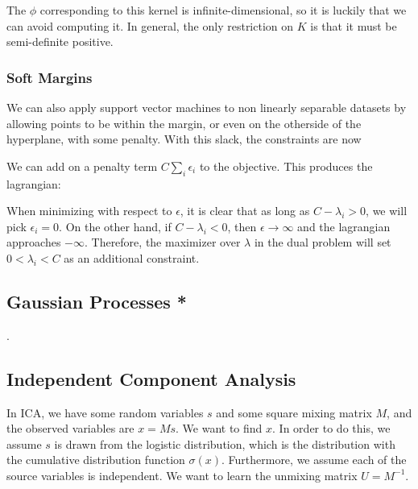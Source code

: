 \documentclass[12pt]{article}
\begin{document}

The $\phi$ corresponding to this kernel is infinite-dimensional, so it is luckily that we can avoid computing it. In general, the only restriction on $K$ is that it must be semi-definite positive.

\subsubsection{Soft Margins}

We can also apply support vector machines to non linearly separable datasets by allowing points to be within the margin, or even on the otherside of the hyperplane, with some penalty. With this slack, the constraints are now


We can add on a penalty term $C\sum_i \epsilon_i$ to the objective. This produces the lagrangian:


When minimizing with respect to $\epsilon$, it is clear that as long as $C-\lambda_i > 0$, we will pick $\epsilon_i = 0$. On the other hand, if $C -\lambda_i < 0$, then $\epsilon \rightarrow \infty$ and the lagrangian approaches $- \infty$. Therefore, the maximizer over $\lambda$ in the dual problem will set $0 < \lambda_i < C$ as an additional constraint.

\subsection{Gaussian Processes *}
.
\subsection{Independent Component Analysis}

In ICA, we have some random variables $s$ and some square mixing matrix $M$, and the observed variables are $x = Ms$. We want to find $x$. In order to do this, we assume $s$ is drawn from the logistic distribution, which is the distribution with the cumulative distribution function $\sigma(x)$. Furthermore, we assume each of the source variables is independent. We want to learn the unmixing matrix $U = M^{-1}$. 
\end{document}
